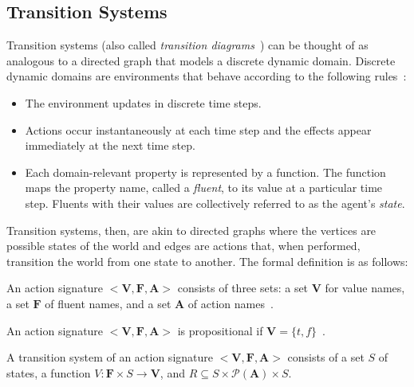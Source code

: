\subsection{Transition Systems}
\label{subsec:transition_systems}

Transition systems (also called \textit{transition diagrams}~\citep{blount_architecture_2013}) can be thought of as analogous to a directed graph that models a discrete dynamic domain.
Discrete dynamic domains are environments that behave according to the following rules~\citep{blount_architecture_2013}:

\begin{itemize}
    \item The environment updates in discrete time steps.
    \item Actions occur instantaneously at each time step and the effects appear immediately at the next time step.
    \item Each domain-relevant property is represented by a function.
        The function maps the property name, called a \textit{fluent}, to its value at a particular time step.
        Fluents with their values are collectively referred to as the agent's \textit{state}.
\end{itemize}

Transition systems, then, are akin to directed graphs where the vertices are possible states of the world and edges are actions that, when performed, transition the world from one state to another.
The formal definition is as follows:

\begin{definition}
    An action signature $ < \boldsymbol{V}, \boldsymbol{F}, \boldsymbol{A}> $ consists of three sets: a set $ \boldsymbol{V} $ for value names, a set $ \boldsymbol{F} $ of fluent names, and a set $ \boldsymbol{A} $ of action names~\citep{gelfond_action_1998}.
\end{definition}

\begin{definition}
    An action signature $< \boldsymbol{V}, \boldsymbol{F}, \boldsymbol{A}>$ is propositional if $\boldsymbol{V}=\{t,f\}$~\citep{gelfond_action_1998}.
\end{definition}

\begin{definition}
    A transition system of an action signature $ < \boldsymbol{V}, \boldsymbol{F}, \boldsymbol{A}> $ consists of a set $ S $ of states, a function $ V : \boldsymbol{F} \times S\rightarrow \boldsymbol{V} $, and $ R \subseteq S \times \mathcal{P}(\boldsymbol{A}) \times S $.
\end{definition}

